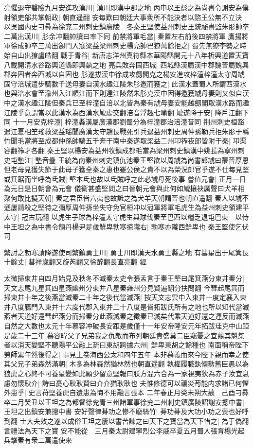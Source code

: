 亮懼退守磬險九月安進攻漢川|{
	漢川即漢中郡之地}
丙申以王彪之為尚書令謝安為僕射領吏部共掌朝政|{
	朝直遥翻}
安每歎曰朝廷大事衆所不能決者以諮王公無不立決　以吳國内史刁彞為徐兖二州刺史鎮廣陵　冬秦王堅使益州刺史王統祕書監朱肜帥卒二萬出漢川|{
	肜余冲翻帥讀曰率下同}
前禁將軍毛當|{
	秦置左右前後四禁將軍}
鷹揚將軍徐成帥卒三萬出劔門入寇梁益梁州刺史楊亮帥巴獠萬餘拒之|{
	蜀先無獠李勢之時始自山出獠盧皓翻}
戰于青谷|{
	新唐志洋州真符縣本華陽縣開元十八年析興道置天寶八載開清水谷路興道縣即興埶之地}
亮兵敗奔固西城|{
	西城縣漢屬漢中郡魏晉屬魏興郡奔固者奔西城以自固也}
肜遂拔漢中徐成攻劔閣克之楊安進攻梓潼梓潼太守周虓固守涪城遣步騎數千送母妻自漢水趣江陵朱肜邀而獲之|{
	此漢水蓋蜀人所謂西漢水也與涪水會至渝州入江順江而下則達江陵然朱肜克漢中因得邀獲虓母妻則又似自漢中之漢水趣江陵但秦兵已至梓潼自涪以北皆為秦有虓母妻安能越劔閣取漢水路而趣江陵乎意謂當以此漢水為西漢水虓虚交翻涪音浮趣七喻翻}
虓遂降于安|{
	降戶江翻下同}
十一月安克梓潼|{
	梓潼縣漢屬廣漢郡劉蜀分為梓潼郡治涪潼音同}
荆州刺史桓豁遣江夏相笁瑤救梁益瑶聞廣漢太守趙長戰死引兵退益州刺史周仲孫勒兵拒朱肜于緜竹聞毛當將至成都仲孫帥騎五千奔于南中秦遂取梁益二州卭筰夜郎皆附于秦|{
	卭渠容翻筰才各翻}
秦王堅以楊安為益州牧鎮成都毛當為梁州刺史鎮漢中姚萇為寧州刺史屯墊江|{
	墊音疊}
王統為南秦州刺史鎮仇池秦王堅欲以周虓為尚書郎虓曰蒙晉厚恩但老母見獲失節于此母子獲全秦之惠也雖公侯之貴不以為榮況郎官乎遂不仕每見堅或箕踞而坐呼為氐賊|{
	堅本氐也故以氐賊呼之此必虓母死後事}
嘗值元會|{
	正月一日為元日是日朝會為元會}
儀衛甚盛堅問之曰晉朝元會與此何如虓攘袂厲聲曰犬羊相聚何敢比擬天朝|{
	秦之君臣皆六夷也故詆之為犬羊天朝謂晉也朝直遥翻}
秦人以虓不遜屢請殺之堅待之彌厚周仲孫坐失守免官桓冲以冠軍將軍毛虎生為益州刺史領建平太守|{
	冠古玩翻}
以虎生子球為梓潼太守虎生與球伐秦至巴西以糧乏退屯巴東　以侍中王坦之為中書令領丹楊尹是歲鮮卑勃寒掠隴右|{
	勃寒亦隴西鮮卑也}
秦王堅使乞伏司

繁討之勃寒請降遂使司繁鎮勇士川|{
	勇士川即漢天水勇士縣之地}
有彗星出于尾箕長十餘丈|{
	彗祥歲翻又旋芮翻又徐醉翻長直亮翻}
經

太微掃東井自四月始見及秋冬不滅秦太史令張孟言于秦王堅曰尾箕燕分東井秦分|{
	天文志尾九星箕四星燕幽州分東井八星秦雍州分見賢遍翻分扶問翻}
今彗起尾箕而掃東井十年之後燕當滅秦二十年之後代當滅燕|{
	按天文志雲中入東井一度定襄入東井八度鴈門入東井十六度代郡入東井二十八度是皆拓跋氏所有之地也所以知代當滅燕者天道好還彗起燕分而掃秦分此燕滅秦之徵秦已滅矣代乘天道好還之運反而滅燕自然之大數也太元十年慕容冲破長安距是歲僅十一年安帝隆安元年拓跋珪克中山距是歲二十三年}
慕容暐父子兄弟我之仇敵而布列朝廷貴盛莫二臣竊憂之宜翦其魁桀者以消天變堅不聽陽平公融上疏曰東胡跨據六州|{
	鮮卑東胡之餘種也}
南面稱帝陛下勞師累年然後得之|{
	事見上卷海西公太和四年五年}
本非慕義而來今陛下親而幸之使其父兄子弟森然滿朝|{
	木多為林森然猶林然也朝直遥翻}
執權履職埶傾勲舊臣愚以為狼虎之心終不可養星變如此願少留意堅報曰朕方混六合為一家視夷狄為赤子汝宜息慮勿懷耿介|{
	詩曰憂心耿耿賢曰介介猶耿耿也}
夫惟修德可以禳災苟能内求諸已何懼外患乎|{
	史言苻堅養虎自遺患為悔不用融言張本}
二年春正月癸未朔大赦　己酉刁彞卒二月癸丑以王坦之為都督徐兖青三州諸軍事徐兖二州刺史鎮廣陵詔謝安摠中書|{
	王坦之出鎮安兼摠中書}
安好聲律朞功之慘不廢絲竹|{
	朞功朞及大功小功之喪也好呼到翻}
士大夫效之遂以成俗王坦之屢以書苦諫之曰天下之寶當為天下惜之|{
	為于偽翻言禮法為天下之寶}
安不能從　三月秦太尉建寧烈公李威卒夏五月蜀人張育楊光起兵擊秦有衆二萬遣使來

